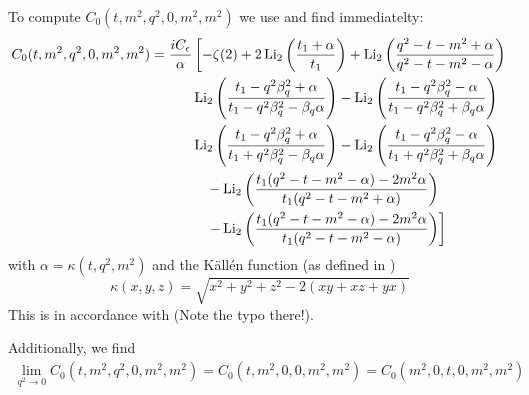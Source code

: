 To compute $C_0(t,m^2,q^2,0,m^2,m^2)$ we use \cite{Denner:2005nn} and find immediatelty:
\begin{align}
C_0(t,m^2,q^2,0,m^2,m^2) &= \frac{i C_\epsilon}{\alpha}\left[-\zeta(2)+2\operatorname{\text{Li}_2}\left(\frac{t_1+\alpha}{t_1}\right)+\operatorname{\text{Li}_2}\left(\frac{q^2-t-m^2+\alpha}{q^2-t-m^2-\alpha}\right)\right.\nonumber\\
&\hspace{30pt}\operatorname{\text{Li}_2}\left(\frac{t_1-q^2\beta_q^2+\alpha}{t_1-q^2\beta_q^2-\beta_q\alpha}\right)-\operatorname{\text{Li}_2}\left(\frac{t_1-q^2\beta_q^2-\alpha}{t_1-q^2\beta_q^2+\beta_q\alpha}\right)\nonumber\\
&\hspace{30pt}\operatorname{\text{Li}_2}\left(\frac{t_1-q^2\beta_q^2+\alpha}{t_1+q^2\beta_q^2-\beta_q\alpha}\right)-\operatorname{\text{Li}_2}\left(\frac{t_1-q^2\beta_q^2-\alpha}{t_1+q^2\beta_q^2+\beta_q\alpha}\right)\nonumber\\
&\hspace{40pt}-\operatorname{\text{Li}_2}\left(\frac{t_1(q^2-t-m^2-\alpha)-2m^2\alpha}{t_1(q^2-t-m^2+\alpha)}\right)\nonumber\\
&\hspace{40pt}\left.-\operatorname{\text{Li}_2}\left(\frac{t_1(q^2-t-m^2-\alpha)-2m^2\alpha}{t_1(q^2-t-m^2-\alpha)}\right)\right]
\end{align}
with $\alpha=\kappa(t,q^2,m^2)$ and the Källén function (as defined in \cite[eq. (4.27)]{Denner:2005nn})
\begin{equation}
\kappa(x,y,z)=\sqrt{x^2+y^2+z^2-2(xy+xz+yx)}
\end{equation}
This is in accordance with \cite[eq. (A.8)]{Laenen1993162}(Note the typo there!).

Additionally, we find
\begin{align}
\lim_{q^2\rightarrow 0}C_0(t,m^2,q^2,0,m^2,m^2) = C_0(t,m^2,0,0,m^2,m^2) = C_0(m^2,0,t,0,m^2,m^2)
\end{align}
